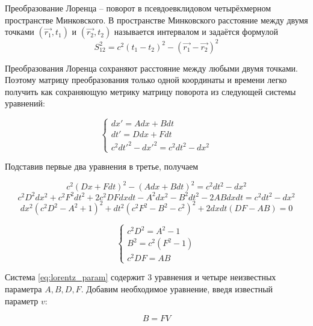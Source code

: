 \documentclass{article}
\begin{document}
Преобразование Лоренца -- поворот в псевдоевклидовом четырёхмерном пространстве Минковского. В пространстве Минковского расстояние между двумя точками $\left(\vec{r_1}, t_1\right)$ и $\left(\vec{r_2}, t_2\right)$ называется интервалом и задаётся формулой
\begin{equation}
    S_{12}^2=c^2\left(t_1-t_2\right)^2-\left(\vec{r_1}-\vec{r_2}\right)^2
\end{equation}

Преобразования Лоренца сохраняют расстояние между любыми двумя точками. Поэтому матрицу преобразования только одной координаты и времени легко получить как сохраняющую метрику матрицу поворота из следующей системы уравнений:

\begin{equation}\label{eq:lorentz_x}
    \begin{cases}
    dx'=Adx+Bdt\\
    dt'=Ddx+Fdt\\
    c^2dt'^2-dx'^2=c^2dt^2-dx^2
    \end{cases}
\end{equation}

Подставив первые два уравнения в третье, получаем

\begin{equation*}
    c^2\left(Dx+Fdt\right)^2-\left(Adx+Bdt\right)^2=c^2dt^2-dx^2
\end{equation*}
\begin{equation*}
    c^2D^2dx^2+c^2F^2dt^2+2c^2DFdxdt-A^2dx^2-B^2dt^2-2ABdxdt=c^2dt^2-dx^2
\end{equation*}
\begin{equation*}
    dx^2\left(c^2D^2-A^2+1\right)^2+dt^2\left(c^2F^2-B^2-c^2\right)^2+2dxdt\left(DF-AB\right)=0
\end{equation*}

\begin{equation}\label{eq:lorentz_param}
    \begin{cases}
    c^2D^2=A^2-1\\
    B^2=c^2\left(F^2-1\right)\\
    c^2DF=AB
    \end{cases}
\end{equation}

Система \eqref{eq:lorentz_param} содержит 3 уравнения и четыре неизвестных параметра $A, B, D, F$. Добавим необходимое уравнение, введя известный параметр $v$:

\begin{equation*}
    B=FV
\end{equation*}
\end{document}
